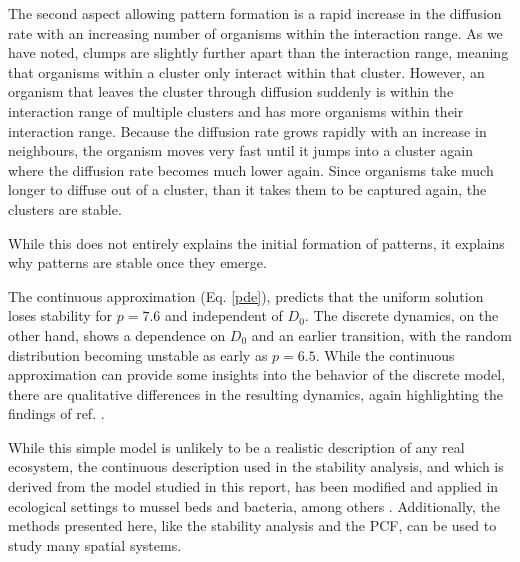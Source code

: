 \documentclass{article}
\begin{document}
The second aspect allowing pattern formation is a rapid increase in the diffusion rate with an increasing number of organisms within the interaction range. 
As we have noted, clumps are slightly further apart than the interaction range, meaning that organisms within a cluster only interact within that cluster.
However, an organism that leaves the cluster through diffusion suddenly is within the interaction range of multiple clusters and has more organisms within their interaction range. 
Because the diffusion rate grows rapidly with an increase in neighbours, the organism moves very fast until it jumps into a cluster again where the diffusion rate becomes much lower again.
Since organisms take much longer to diffuse out of a cluster, than it takes them to be captured again, the clusters are stable.

While this does not entirely explains the initial formation of patterns, it explains why patterns are stable once they emerge.

The continuous approximation (Eq. \ref{pde}), predicts that the uniform solution loses stability for $p=7.6$ and independent of $D_0$. 
The discrete dynamics, on the other hand, shows a dependence on $D_0$ and an earlier transition, with the random distribution becoming unstable as early as $p=6.5$.
While the continuous approximation can provide some insights into the behavior of the discrete model, there are qualitative differences in the resulting dynamics, again highlighting the findings of ref. \autocite{durrettImportanceBeingDiscrete1994}.

While this simple model is unlikely to be a realistic description of any real ecosystem, the continuous description used in the stability analysis, and which is derived from the model studied in this report, has been modified and applied in ecological 
settings to mussel beds and bacteria, among others \autocite{liuPhaseSeparationDriven2016,liuPhaseSeparationExplains2013}.
Additionally, the methods presented here, like the stability analysis and the PCF, can be used to study many spatial systems.

\end{document}
